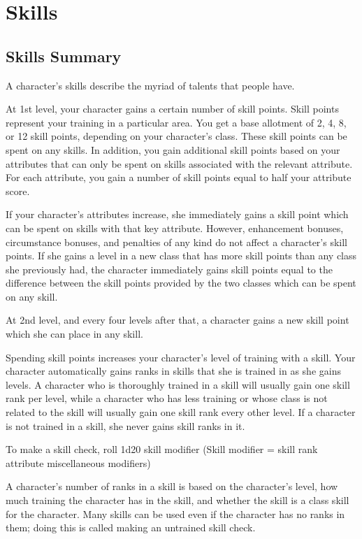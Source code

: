 \chapter{Skills}
\section{Skills Summary}
A character's skills describe the myriad of talents that people have.

 At 1st level, your character gains a certain number of skill points. Skill points represent your training in a particular area. You get a base allotment of 2, 4, 8, or 12 skill points, depending on your character's class. These skill points can be spent on any skills. In addition, you gain additional skill points based on your attributes that can only be spent on skills associated with the relevant attribute. For each attribute, you gain a number of skill points equal to half your attribute score.

\par If your character's attributes increase, she immediately gains a skill point which can be spent on skills with that key attribute. However, enhancement bonuses, circumstance bonuses, and penalties of any kind do not affect a character's skill points. If she gains a level in a new class that has more skill points than any class she previously had, the character immediately gains skill points equal to the difference between the skill points provided by the two classes which can be spent on any skill.

\par At 2nd level, and every four levels after that, a character gains a new skill point which she can place in any skill.

 Spending skill points increases your character's level of training with a skill. Your character automatically gains ranks in skills that she is trained in as she gains levels. A character who is thoroughly trained in a skill will usually gain one skill rank per level, while a character who has less training or whose class is not related to the skill will usually gain one skill rank every other level. If a character is not trained in a skill, she never gains skill ranks in it.

 To make a skill check, roll 1d20 \add skill modifier (Skill modifier = skill rank \add attribute \add miscellaneous modifiers)

 A character's number of ranks in a skill is based on the character's level, how much training the character has in the skill, and whether the skill is a class skill for the character. Many skills can be used even if the character has no ranks in them; doing this is called making an untrained skill check.


